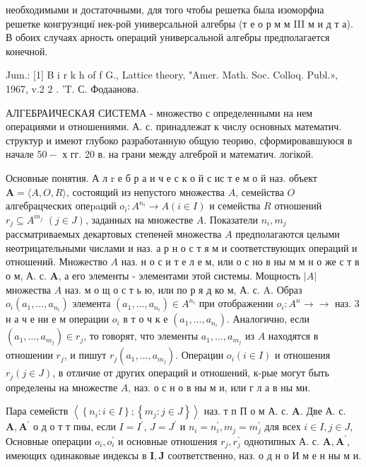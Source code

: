 \documentclass[10pt]{article}
\begin{document}
необходимыми и достаточными, для того чтобы решетка была изоморфна решетке конгруэнциї нек-рой универсальной алгебры (т е о р м м III м и д т а). В обоих случаях арность операций универсальной алгебры предполагается конечной.



Jum.: [1] B i r k h of f G., Lattice theory, "Amer. Math. Soc. Colloq. Publ.», 1967, v.2 2 . 'T. С. Фодаанова.



АЛГЕБРАИЧЕСКАЯ СИСТЕМА - множество с определенными на нем операциями и отношениями. А. с. принадлежат к числу основных математич. структур и имеют глубоко разработанную общую теорию, сформировавшуюся в начале $50-$ х гг. 20 в. на грани между алгеброй и математич. логікой.



Основные понятия. А л $\mathrm{r}$ е б р а и ч е с к о й с ис т е м о й наз. объект $\boldsymbol{A}=\langle A, O, R\rangle$, состоящий из непустого множества $A$, семейства $O$ алгебрацческих опеpaций $o_{i}: A^{n_{i}} \rightarrow A(i \in I)$ и семейства $R$ отношений $r_{j} \subseteq A^{m_{j}}$ $(j \in J)$, заданных на множестве $A$. Показатели $n_{i}, m_{j}$ рассматриваемых декартовых степеней множества $A$ предполагаются целыми неотрицательными числами и наз. а р н о с т я м и соответствующих операций и отношений. Множество $A$ наз. н о с и т е л е м, или о с но в ны м м н о же с т в о м, А. с. $\boldsymbol{A}$, а его элементы - элементами этой системы. Мощность $|A|$ множества $A$ наз. м $о$ щ о с т ь ю, или по р я д ко м, А. с. A. Образ $o_{i}\left(a_{1}, \ldots, a_{n_{i}}\right)$ элемента $\left(a_{1}, \ldots, a_{n_{i}}\right) \in A^{n_{i}}$ при отображении $o_{i}: A^{n} \rightarrow \rightarrow$ наз. 3 н а ч е ни е м операции $o_{i}$ в т о ч к е $\left(a_{1}, \ldots, a_{n_{i}}\right)$. Аналогично, если $\left(a_{1}, \ldots, a_{m_{j}}\right) \in r_{j}$, то говорят, что элементы $a_{1}, \ldots, a_{m_{j}}$ из $A$ находятся в отношении $r_{j}$, и пишут $r_{j}\left(a_{1}, \ldots, a_{m_{j}}\right)$. Операции $o_{i}(i \in I)$ и отношения $r_{j}(j \in J)$, в отличие от других операций и отношений, к-рые могут быть определены на множестве $A$, наз. о с н о в ны м и, или г л а в ны ми.



Пара семейств $\left\langle\left\{n_{i}: i \in I\right\} ;\left\{m_{j}: j \in J\right\}\right\rangle$ наз. т п П о м А. с. $\boldsymbol{A}$. Две А. с. $\boldsymbol{A}, \boldsymbol{A}^{\prime}$ о д о т т пны, если $I=I^{\prime}$, $J=J^{\prime}$ и $n_{i}=n_{i}^{\prime}, m_{j}=m_{j}^{\prime}$ для всех $i \in I, j \in J$, Основные операции $o_{i}, o_{i}^{\prime}$ и основные отношения $r_{j}, r_{j}^{\prime}$ однотипных А. с. $\boldsymbol{A}, \boldsymbol{A}^{\prime}$, имеющих одинаковые индексы в $\boldsymbol{I}, \boldsymbol{J}$ соответственно, наз. о д н о И м е н ны м и.
\end{document}

